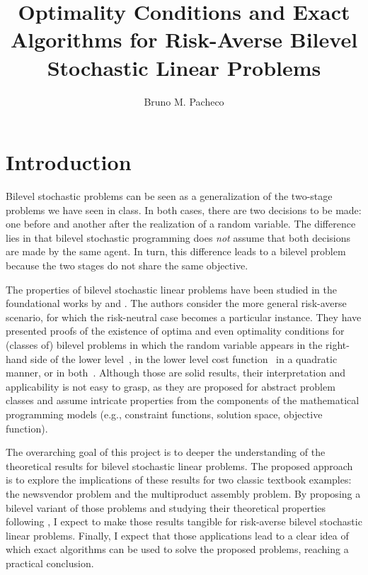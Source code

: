 \documentclass[12pt]{article}
\begin{document}
\title{Optimality Conditions and Exact Algorithms for Risk-Averse Bilevel Stochastic Linear Problems}

\author{Bruno M. Pacheco}

\maketitle


\section*{Introduction}

Bilevel stochastic problems can be seen as a generalization of the two-stage problems we have seen in class.
In both cases, there are two decisions to be made: one before and another after the realization of a random variable.
The difference lies in that bilevel stochastic programming does \emph{not} assume that both decisions are made by the same agent.
In turn, this difference leads to a bilevel problem because the two stages do not share the same objective.

The properties of bilevel stochastic linear problems have been studied in the foundational works by \citet{burtscheidtRiskAverseModelsBilevel2020} and \citet{clausExistenceSolutionsClass2022a,clausContinuityRiskaverseBilevel2021}.
The authors consider the more general risk-averse scenario, for which the risk-neutral case becomes a particular instance.
They have presented proofs of the existence of optima and even optimality conditions for (classes of) bilevel problems in which the random variable appears in the right-hand side of the lower level~\citep{burtscheidtRiskAverseModelsBilevel2020}, in the lower level cost function~\citep{clausContinuityRiskaverseBilevel2021} in a quadratic manner, or in both~\citep{clausExistenceSolutionsClass2022a}.
Although those are solid results, their interpretation and applicability is not easy to grasp, as they are proposed for abstract problem classes and assume intricate properties from the components of the mathematical programming models (e.g., constraint functions, solution space, objective function).

The overarching goal of this project is to deeper the understanding of the theoretical results for bilevel stochastic linear problems.
The proposed approach is to explore the implications of these results for two classic textbook examples: the newsvendor problem and the multiproduct assembly problem.
By proposing a bilevel variant of those problems and studying their theoretical properties following \citet{burtscheidtRiskAverseModelsBilevel2020}, I expect to make those results tangible for risk-averse bilevel stochastic linear problems.
Finally, I expect that those applications lead to a clear idea of which exact algorithms can be used to solve the proposed problems, reaching a practical conclusion.
\end{document}
